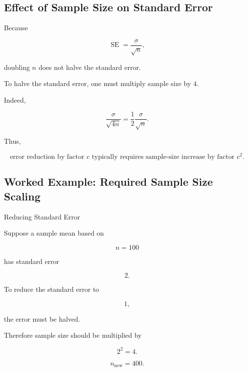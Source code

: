 \subsection{Effect of Sample Size on Standard Error}
\label{subsec:sample-size-standard-error}

Because

\[
\operatorname{SE}
=
\frac{\sigma}{\sqrt{n}},
\]

doubling \(n\) does not halve the standard error.

To halve the standard error, one must multiply sample size by \(4\).

Indeed,

\[
\frac{
\sigma
}{
\sqrt{4n}
}
=
\frac12
\frac{
\sigma
}{
\sqrt{n}
}.
\]

Thus,

\[
\boxed{
\text{error reduction by factor }c
\text{ typically requires sample-size increase by factor }c^2.
}
\]

\subsection{Worked Example: Required Sample Size Scaling}
\label{subsec:worked-clt-sample-size-scaling}

\begin{workedexamplebox}{Reducing Standard Error}

Suppose a sample mean based on

\[
n=100
\]

has standard error

\[
2.
\]

To reduce the standard error to

\[
1,
\]

the error must be halved.

Therefore sample size should be multiplied by

\[
2^2=4.
\]

\begin{answerbox}
\[
\boxed{
n_{\text{new}}
=
400.
}
\]
\end{answerbox}

\end{workedexamplebox}

